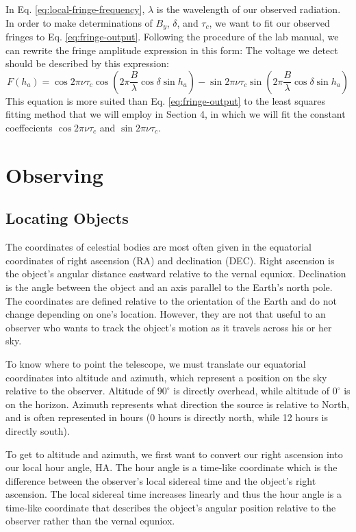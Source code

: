 \documentclass[12pt]{article}
\begin{document}
In Eq. \ref{eq:local-fringe-frequency}, $\lambda$ is the wavelength of our observed radiation. In order to make determinations of $B_y$, $\delta$, and $\tau_c$, we want to fit our observed fringes to Eq. \ref{eq:fringe-output}. Following the procedure of the lab manual, we can rewrite the fringe amplitude expression in this form:
The voltage we detect should be described by this expression:
\begin{equation}
F(h_a) = \cos{2\pi \nu \tau_c} \cos{\left( 2\pi \frac{B}{\lambda} 
\cos{\delta} \sin{h_a} \right)} - \sin{2\pi \nu \tau_c} \sin{\left( 2\pi \frac{B}{\lambda} 
\cos{\delta} \sin{h_a} \right)} \label{eq:fringe-amplitude}
\end{equation}
This equation is more suited than Eq. \ref{eq:fringe-output}  to the least squares fitting method that we will employ in Section 4, in which we will fit the constant coeffecients $ \cos{2\pi \nu \tau_c}$ and $ \sin{2\pi \nu \tau_c}$.

\section{Observing}
\subsection{Locating Objects}
The coordinates of celestial bodies are most often given in the equatorial coordinates of right ascension (RA) and declination (DEC). Right ascension is the object's angular distance eastward relative to the vernal equniox. Declination is the angle between the object and an axis parallel to the Earth's north pole. The coordinates are defined relative to the orientation of the Earth and do not change depending on one's location. However, they are not that useful to an observer who wants to track the object's motion as it travels across his or her sky.

To know where to point the telescope, we must translate our equatorial coordinates into altitude and azimuth, which represent a position on the sky relative to the observer. Altitude of $90^\circ$ is directly overhead, while altitude of $0^\circ$ is on the horizon. Azimuth represents what direction the source is relative to North, and is often represented in hours (0 hours is directly north, while 12 hours is directly south).

To get to altitude and azimuth, we first want to convert our right ascension into our local hour angle, HA. The hour angle is a time-like coordinate which is the difference between the observer's local sidereal time and the object's right ascension. The local sidereal time increases linearly and thus the hour angle is a time-like coordinate that describes the object's angular position relative to the observer rather than the vernal equniox.
\end{document}
